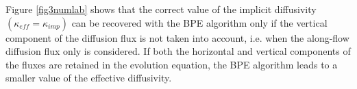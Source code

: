 Figure \ref{fig3numlab} shows that the correct value of the implicit diffusivity $(\kappa_{eff}=\kappa_{imp})$ can be recovered with the BPE algorithm only if the vertical component of the diffusion flux is not taken into account, i.e. when the along-flow diffusion flux only is considered. If both the horizontal and vertical components of the fluxes are retained in the evolution equation, the BPE algorithm leads to a smaller value of the effective diffusivity.
\color{black}


